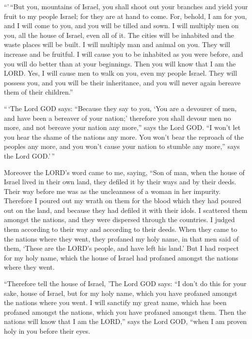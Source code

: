 ``'\,``But you, mountains of Israel, you shall shoot out
your branches and yield your fruit to my people Israel; for they are at
hand to come.  For, behold, I am for you, and I will come to
you, and you will be tilled and sown.  I will multiply men
on you, all the house of Israel, even all of it. The cities will be
inhabited and the waste places will be built.  I will
multiply man and animal on you. They will increase and be fruitful. I
will cause you to be inhabited as you were before, and you will do
better than at your beginnings. Then you will know that I am the LORD.
 Yes, I will cause men to walk on you, even my people
Israel. They will possess you, and you will be their inheritance, and
you will never again bereave them of their children.''

 ``\,`The Lord GOD says: ``Because they say to you, `You
are a devourer of men, and have been a bereaver of your nation;'
 therefore you shall devour men no more, and not bereave
your nation any more,'' says the Lord GOD.  ``I won't let
you hear the shame of the nations any more. You won't bear the reproach
of the peoples any more, and you won't cause your nation to stumble any
more,'' says the Lord GOD.'\,''

 Moreover the LORD's word came to me, saying, 
``Son of man, when the house of Israel lived in their own land, they
defiled it by their ways and by their deeds. Their way before me was as
the uncleanness of a woman in her impurity.  Therefore I
poured out my wrath on them for the blood which they had poured out on
the land, and because they had defiled it with their idols.
 I scattered them amongst the nations, and they were
dispersed through the countries. I judged them according to their way
and according to their deeds.  When they came to the
nations where they went, they profaned my holy name, in that men said of
them, `These are the LORD's people, and have left his land.'
 But I had respect for my holy name, which the house of
Israel had profaned amongst the nations where they went.

 ``Therefore tell the house of Israel, 'The Lord GOD says:
``I don't do this for your sake, house of Israel, but for my holy name,
which you have profaned amongst the nations where you went.
 I will sanctify my great name, which has been profaned
amongst the nations, which you have profaned amongst them. Then the
nations will know that I am the LORD,'' says the Lord GOD, ``when I am
proven holy in you before their eyes.

